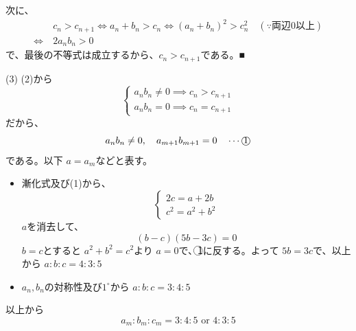 \documentclass[../main.tex]{subfiles}
\begin{document}
次に、
\begin{align*}
  & c_n > c_{n+1} \Leftrightarrow a_n+b_n > c_n \Leftrightarrow (a_n+b_n)^2 > c_n^2 \quad (\because \text{両辺0以上}) \\
  \Leftrightarrow\ & 2a_nb_n > 0
\end{align*}
で、最後の不等式は成立するから、$c_n > c_{n+1}$である。■

(3) (2)から
\begin{equation*}
  \begin{cases}
    a_nb_n \neq 0 \implies c_n > c_{n+1} \\
    a_nb_n = 0 \implies c_n = c_{n+1}
  \end{cases}
\end{equation*}
だから、
\begin{equation*}
  a_nb_n \neq 0, \quad a_{m+1}b_{m+1} = 0 \quad \cdots \text{\textcircled{1}}
\end{equation*}
である。以下 $a = a_m$などと表す。
\begin{itemize}
  \item[$1^\circ\ a_{m+1} = 0\text{の時}$]
    漸化式及び(1)から、
    \begin{equation*}
      \begin{cases} 2c = a+2b \\ c^2 = a^2+b^2
      \end{cases}
    \end{equation*}
    $a$を消去して、
    \begin{equation*}
      (b-c)(5b-3c) = 0
    \end{equation*}
    $b=c$とすると $a^2+b^2=c^2$より $a=0$で、\textcircled{1}に反する。よって $5b = 3c$で、以上から
    $a:b:c = 4:3:5$

  \item[$2^\circ\ b_{m+1} = 0\text{の時}$]
    $a_n, b_n$の対称性及び$1^\circ$から
    $a:b:c = 3:4:5$
\end{itemize}
以上から
\begin{equation*}
  a_m:b_m:c_m = 3:4:5 \text{ or } 4:3:5
\end{equation*}
\end{document}
